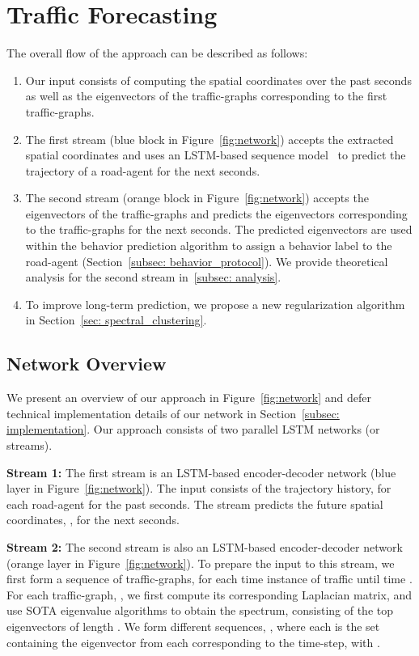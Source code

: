\documentclass[10pt,twocolumn,letterpaper]{article}
\theoremstyle{plain}
\begin{document}
 \section{Traffic Forecasting}
The overall flow of the approach can be described as follows:

\begin{enumerate}[noitemsep]
    \item Our input consists of computing the spatial coordinates over the past  seconds as well as the eigenvectors of the traffic-graphs corresponding to the first  traffic-graphs.
    
    \item The first stream (blue block in Figure~\ref{fig:network}) accepts the extracted spatial coordinates and uses an LSTM-based sequence model~\cite{graves2013generating} to predict the trajectory of a road-agent for the next  seconds.
    
    \item The second stream (orange block in Figure~\ref{fig:network}) accepts the eigenvectors of the traffic-graphs and predicts the eigenvectors corresponding to the traffic-graphs for the next  seconds. The predicted eigenvectors are used within the behavior prediction algorithm to assign a behavior label to the road-agent (Section~\ref{subsec: behavior_protocol}). We provide theoretical analysis for the second stream in~\ref{subsec: analysis}.
    
    \item To improve long-term prediction, we propose a new regularization algorithm in Section~\ref{sec: spectral_clustering}.
\end{enumerate}


\subsection{Network Overview}

We present an overview of our approach in Figure~\ref{fig:network} and defer technical implementation details of our network in Section~\ref{subsec: implementation}. Our approach consists of two parallel LSTM networks (or streams). 


\textbf{Stream 1:} The first stream is an LSTM-based encoder-decoder network (blue layer in Figure~\ref{fig:network}). The input consists of the trajectory history,  for each road-agent for the past  seconds. The stream predicts the future spatial coordinates, , for the next  seconds.

\textbf{Stream 2:} The second stream is also an LSTM-based encoder-decoder network (orange layer in Figure~\ref{fig:network}). To prepare the input to this stream, we first form a sequence of traffic-graphs,  for each time instance of traffic until time . For each traffic-graph, , we first compute its corresponding Laplacian matrix,  and use SOTA eigenvalue algorithms to obtain the spectrum,  consisting of the top  eigenvectors of length . We form  different sequences, , where each  is the set containing the  eigenvector from each  corresponding to the  time-step, with . 
\end{document}
